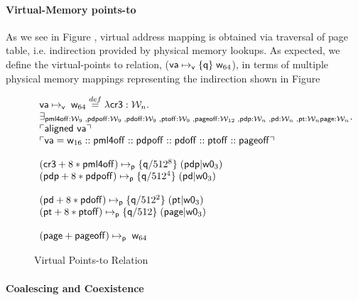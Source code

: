 \paragraph{Virtual-Memory points-to} As we see in Figure , virtual address mapping is obtained via traversal of page table, i.e. indirection provided by physical memory lookups. As expected, we define the virtual-points to relation, ($\mathsf{va}\mapsto_{\mathsf{v}}\{\mathsf{q}\}\;\mathsf{w}_{64}$), in terms of multiple physical memory mappings representing the indirection shown in Figure 
\begin{figure*}
\[
\begin{array}{l}
  \mathsf{va}\mapsto_{\mathsf{v}}\;\mathsf{w}_{64} \stackrel{def}{=} \lambda \mathsf{cr3}:\mathcal{W}_n.\\
  \exists_{\mathsf{pml4off}:\mathcal{W}_{9} \;, \mathsf{pdpoff}:\mathcal{W}_{9} \;, \mathsf{pdoff}:\mathcal{W}_{9} \;,\mathsf{ptoff}:\mathcal{W}_{9} \;, \mathsf{pageoff}:\mathcal{W}_{12} \;, \mathsf{pdp}:\mathcal{W}_n \;, \mathsf{pd}:\mathcal{W}_n \;, \mathsf{pt}:\mathcal{W}_n \mathsf{page}:\mathcal{W}_n} \ldotp \\
  \ulcorner \textsf{aligned } \mathsf{va} \urcorner \\ 
   \ulcorner \mathsf{va} = \mathsf{w}_{16} :: \mathsf{pml4off} :: \mathsf{pdpoff} :: 
   \mathsf{pdoff} :: \mathsf{ptoff} :: \mathsf{pageoff} \urcorner \\\\
  (\mathsf{cr3}+8*\mathsf{pml4off})\mapsto_{\mathsf{p}}\{\mathsf{q}/512^{8}\}\;(\mathsf{pdp} | \mathsf{w0}_{3}) \\ 
  (\mathsf{pdp}+8*\mathsf{pdpoff})\mapsto_{\mathsf{p}}\{\mathsf{q}/512^{4}\}\;(\mathsf{pd} | \mathsf{w0}_{3}) \\ \\
  (\mathsf{pd}+8*\mathsf{pdoff})\mapsto_{\mathsf{p}}\{\mathsf{q}/512^{2}\}\;(\mathsf{pt} | \mathsf{w0}_{3}) \\ 
  (\mathsf{pt}+8*\mathsf{ptoff})\mapsto_{\mathsf{p}}\{\mathsf{q}/512\}\;(\mathsf{page} | \mathsf{w0}_{3}) \\ \\
  (\mathsf{page}+\mathsf{pageoff})\mapsto_{\mathsf{p}}\;\mathsf{w}_{64} 
\end{array}
\]
\caption{Virtual Points-to Relation}
  \label{fig:virtualpointsto}
\end{figure*}
\paragraph{Coalescing and Coexistence} 
